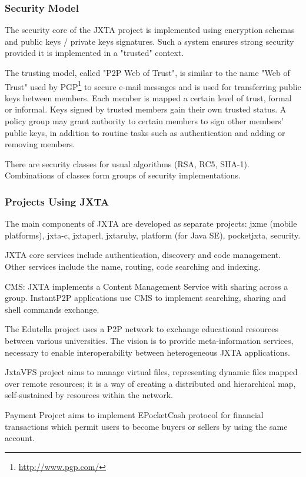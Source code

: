 \subsubsection{Security Model}

The security core of the JXTA project is implemented using encryption schemas
and public keys / private keys signatures. Such a system ensures strong
security provided it is implemented in a "trusted" context.

The trusting model, called "P2P Web of Trust", is similar to the name "Web of
Trust" used by PGP\footnote{\url{http://www.pgp.com/}} to secure e-mail messages and is used for transferring public keys
between members. Each member is mapped a certain level of trust, formal or
informal. Keys signed by trusted members gain their own trusted status. A
policy group may grant authority to certain members to sign other members'
public keys, in addition to routine tasks such as authentication and adding or
removing members.

There are security classes for usual algorithms (RSA, RC5, SHA-1). Combinations
of classes form groups of security implementations.

\subsubsection{Projects Using JXTA}

The main components of JXTA are developed as separate projects:
jxme (mobile platforms), jxta-c, jxtaperl, jxtaruby, platform (for Java SE),
pocketjxta, security.

JXTA core services include authentication, discovery and code management.
Other services include the name, routing, code searching and indexing.

CMS: JXTA implements a Content Management Service with sharing across a group.
InstantP2P applications use CMS to implement searching, sharing and shell
commands exchange.

The Edutella project uses a P2P network to exchange educational resources between
various universities. The vision is to provide meta-information services,
necessary to enable interoperability between heterogeneous JXTA applications.

JxtaVFS project aims to manage virtual files, representing dynamic files mapped
over remote resources; it is a way of creating a distributed and hierarchical map,
self-sustained by resources within the network.

Payment Project aims to implement EPocketCash protocol for financial
transactions which permit users to become buyers or sellers by using the same
account.

